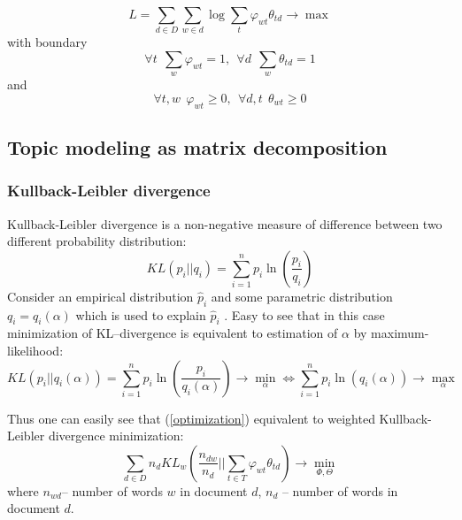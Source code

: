 \documentclass{article}
\begin{document}
            \begin{equation} \label{optimization} L = \sum_{d \in D} \sum_{w \in d} \log \sum_{t} \varphi_{wt} \theta_{td}  \to \max \end{equation}
	     with boundary
            \begin{equation} \forall t \ \ \sum_{w} \varphi_{wt} = 1, \ \ \forall d \ \ \sum_{w} \theta_{td} = 1 \end{equation}
            and 
            \begin{equation} \forall t, w \ \  \varphi_{wt}  \geq 0, \ \ \forall d, t \ \ \theta_{wt}  \geq 0 \end{equation}
    
        \subsection{Topic modeling as matrix decomposition}
        
            \subsubsection{Kullback-Leibler divergence}
                Kullback-Leibler divergence is a non-negative measure of difference between two different probability distribution:
                \begin{equation} KL(p_i||q_i) = \sum_{i=1}^n p_i \ln\left(\frac{p_i}{q_i}\right)  \end{equation}
                Consider an empirical distribution $\hat{p}_i$ and some parametric distribution $q_i = q_i(\alpha)$ which is used to explain $\hat{p}_i$ . 
                Easy to see that in this case minimization of KL\---divergence is equivalent to estimation of $\alpha$ by maximum-likelihood: 
                \begin{equation} KL(p_i||q_i(\alpha)) = \sum_{i=1}^n p_i \ln\left(\frac{p_i}{q_i(\alpha)}\right) \to \min_{\alpha} 
                \Leftrightarrow \sum_{i=1}^n p_i \ln(q_i(\alpha)) \to \max_{\alpha} \end{equation}
                
                Thus one can easily see that (\ref{optimization}) equivalent to weighted Kullback-Leibler divergence minimization:
                \begin{equation} 
                    \sum_{d \in D} n_d KL_w \left( \frac{n_{dw}}{n_d} || \sum_{t \in T} \varphi_{wt}\theta_{td} \right) \to \min_{\Phi, \Theta}
                \end{equation}
                 where $n_{wd}$\--- number of words $w$ in document $d$, $n_d$ \--- number of words in document $d$.
            
\end{document}
